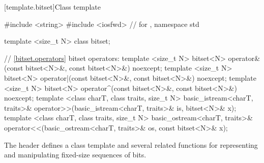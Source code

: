 [template.bitset]{Class template }%
%

%
%

\begin{codeblock}
#include <string>
#include <iosfwd>               // for , 
namespace std {
  template <size_t N> class bitset;

  // \ref{bitset.operators} bitset operators:
  template <size_t N>
    bitset<N> operator&(const bitset<N>&, const bitset<N>&) noexcept;
  template <size_t N>
    bitset<N> operator|(const bitset<N>&, const bitset<N>&) noexcept;
  template <size_t N>
    bitset<N> operator^(const bitset<N>&, const bitset<N>&) noexcept;
  template <class charT, class traits, size_t N>
    basic_istream<charT, traits>&
    operator>>(basic_istream<charT, traits>& is, bitset<N>& x);
  template <class charT, class traits, size_t N>
    basic_ostream<charT, traits>&
    operator<<(basic_ostream<charT, traits>& os, const bitset<N>& x);
}
\end{codeblock}

\pnum
The header
defines a
class template
and several related functions for representing
and manipulating fixed-size sequences of bits.

